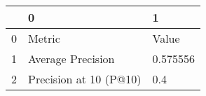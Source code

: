 \begin{tabular}{lll}
\toprule
{} &                       0 &         1 \\
\midrule
0 &                  Metric &     Value \\
1 &       Average Precision &  0.575556 \\
2 &  Precision at 10 (P@10) &       0.4 \\
\bottomrule
\end{tabular}
